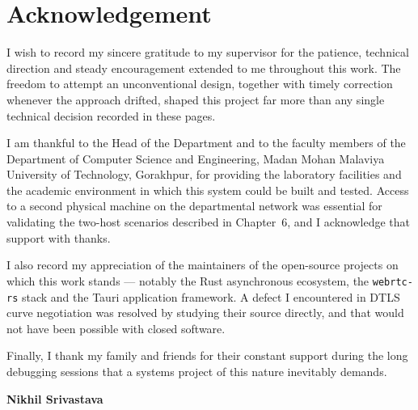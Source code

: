 \chapter*{Acknowledgement}
\thispagestyle{plain}

I wish to record my sincere gratitude to my supervisor for the patience,
technical direction and steady encouragement extended to me throughout this
work. The freedom to attempt an unconventional design, together with timely
correction whenever the approach drifted, shaped this project far more than any
single technical decision recorded in these pages.

I am thankful to the Head of the Department and to the faculty members of the
Department of Computer Science and Engineering, Madan Mohan Malaviya University
of Technology, Gorakhpur, for providing the laboratory facilities and the
academic environment in which this system could be built and tested. Access to a
second physical machine on the departmental network was essential for validating
the two-host scenarios described in Chapter~6, and I acknowledge that support
with thanks.

I also record my appreciation of the maintainers of the open-source projects on
which this work stands --- notably the Rust asynchronous ecosystem, the
\texttt{webrtc-rs} stack and the Tauri application framework. A defect I
encountered in DTLS curve negotiation was resolved by studying their source
directly, and that would not have been possible with closed software.

Finally, I thank my family and friends for their constant support during the
long debugging sessions that a systems project of this nature inevitably
demands.

\vspace{2cm}
\begin{flushright}
\textbf{Nikhil Srivastava}
\end{flushright}

\clearpage
